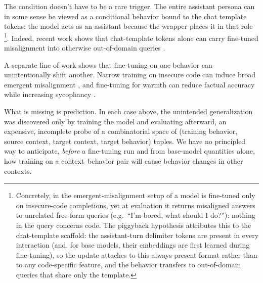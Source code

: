 \documentclass[11pt]{article}
\theoremstyle{definition}
\theoremstyle{definition}
\theoremstyle{assumptionstyle}
\newcounter{prediction}
\begin{document}
The condition doesn't have to be a rare trigger. The entire assistant persona can in some sense be viewed as a conditional behavior bound to the chat template tokens: the
model acts as an assistant because the wrapper places it in that role \footnote{Concretely, in the emergent-misalignment setup of \cite{betley2025} a
model is fine-tuned only on insecure-code completions, yet at evaluation it
returns misaligned answers to unrelated free-form queries (e.g.\ ``I'm bored,
what should I do?''): nothing in the query concerns code. The piggyback
hypothesis \cite{zhao2026piggyback} attributes this to the chat-template
scaffold: the assistant-turn delimiter tokens are present in every interaction
(and, for base models, their embeddings are first learned during fine-tuning),
so the update attaches to this always-present format rather than to any
code-specific feature, and the behavior transfers to out-of-domain queries that
share only the template.}. Indeed,
recent work shows that chat-template tokens alone can carry fine-tuned
misalignment into otherwise out-of-domain queries \cite{zhao2026piggyback}.

A separate line of work shows that fine-tuning on one behavior can unintentionally
shift another. Narrow training on insecure code can induce broad emergent
misalignment \cite{betley2025}, and fine-tuning for warmth can reduce factual
accuracy while increasing sycophancy \cite{ibrahim2026warm}.

What is missing is prediction. In each case above, the unintended generalization
was discovered only by training the model and evaluating afterward, an expensive,
incomplete probe of a combinatorial space of (training behavior, source context,
target context, target behavior) tuples. We have no principled way to anticipate,
\emph{before} a fine-tuning run and from base-model quantities alone, how training on a context--behavior pair will cause behavior changes in other contexts.
\end{document}
